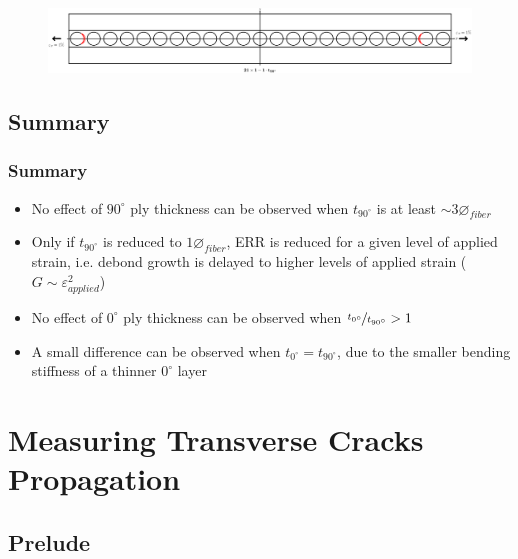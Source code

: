 \documentclass[first,firstsupp,lastsupp,last,hyperref,table]{ETHclass}
\begin{document}
\begin{frame}
\begin{columns}[c]
\begin{column}{0.5\textwidth}
\begin{figure}
\end{figure}
\end{column}
\end{columns}
\begin{figure}
\centering
\includegraphics[width=\textwidth]{twofibers-sameside-crackshielding21-thin.pdf}
\end{figure}
\end{frame}

\subsection{Summary}

\begin{frame}
\frametitle{Summary}
\vspace{-0.5cm}
\centering
\begin{itemize}[label=]
\item No effect of  $90^{\circ}$ ply thickness can be observed when $t_{90^{\circ}}$ is at least $\sim3\diameter_{fiber}$
\item Only if $t_{90^{\circ}}$ is reduced to $1\diameter_{fiber}$, ERR is reduced for a given level of applied strain, i.e. debond growth is delayed to higher levels of applied strain ($G\sim\varepsilon_{applied}^{2}$)
\item No effect of  $0^{\circ}$ ply thickness can be observed when $\nicefrac{t_{0^{\circ}}}{t_{90^{\circ}}}>1$
\item A small difference can be observed when  $t_{0^{\circ}}=t_{90^{\circ}}$, due to the smaller bending stiffness of a thinner $0^{\circ}$ layer
\end{itemize}
\end{frame}

\section{Measuring Transverse Cracks Propagation}

\subsection{Prelude}
\end{document}
